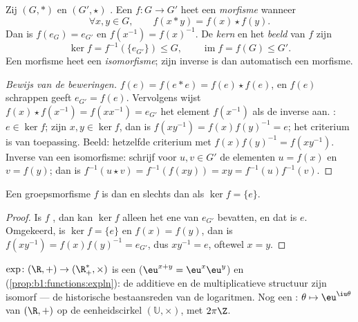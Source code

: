 \begin{definition}[Groepsmorfisme]\label{def:b1:structures:morphism}
Zij $(G, *)$ en $(G', \star)$ . Een  $f \colon G \to G'$
heet een \emph{morfisme} wanneer
\[
\forall x, y \in G, \qquad f(x * y) = f(x) \star f(y).
\]
Dan is $f(e_G) = e_{G'}$ en $f(x^{-1}) = f(x)^{-1}$. De
\emph{kern} en het \emph{beeld} van $f$ zijn
\[
\ker f = f^{-1}(\{e_{G'}\}) \leq G,
\qquad
\operatorname{im} f = f(G) \leq G' .
\]
Een  morfisme heet een \emph{isomorfisme}; zijn inverse
 is dan automatisch een morfisme.
\end{definition}

\begin{proof}[Bewijs van de beweringen]
$f(e) = f(e * e) = f(e)\star f(e)$, en $f(e)$ schrappen geeft $e_{G'} =
f(e)$. Vervolgens wijst $f(x)\star f(x^{-1}) = f(x x^{-1}) = e_{G'}$ het
element $f(x^{-1})$ als de inverse aan. : $e \in \ker f$; zijn $x, y
\in \ker f$, dan is $f(xy^{-1}) = f(x)f(y)^{-1} = e$; het criterium is
van toepassing. Beeld: hetzelfde criterium met $f(x)f(y)^{-1} =
f(xy^{-1})$. Inverse van een isomorfisme: schrijf voor $u, v \in G'$ de
elementen $u = f(x)$ en $v = f(y)$; dan is $f^{-1}(u \star v) =
f^{-1}(f(xy)) = xy = f^{-1}(u) f^{-1}(v)$.
\end{proof}

\begin{proposition}\label{prop:b1:structures:kernel}
Een groepsmorfisme $f$ is  dan en slechts dan als $\ker f =
\{e\}$.
\end{proposition}

\begin{proof}
Is $f$ , dan kan $\ker f$ alleen het ene  van $e_{G'}$
bevatten, en dat is $e$. Omgekeerd, is $\ker f = \{e\}$ en $f(x) = f(y)$,
dan is $f(xy^{-1}) = f(x) f(y)^{-1} = e_{G'}$, dus $xy^{-1} = e$, oftewel
$x = y$.
\end{proof}

\begin{example}\label{ex:b1:structures:expmorphism}
$\exp \colon (\R, +) \to (\R_+^*, \times)$ is een  ($\eu^{x+y} =
\eu^x \eu^y$) en  (\cref{prop:b1:functions:expln}): de additieve
en de multiplicatieve structuur zijn isomorf --- de historische
bestaansreden van de logaritmen. Nog een : $\theta \mapsto
\eu^{\iu\theta}$ van $(\R, +)$ op de eenheidscirkel $(\mathbb{U},
\times)$, met  $2\pi\Z$.
\end{example}

